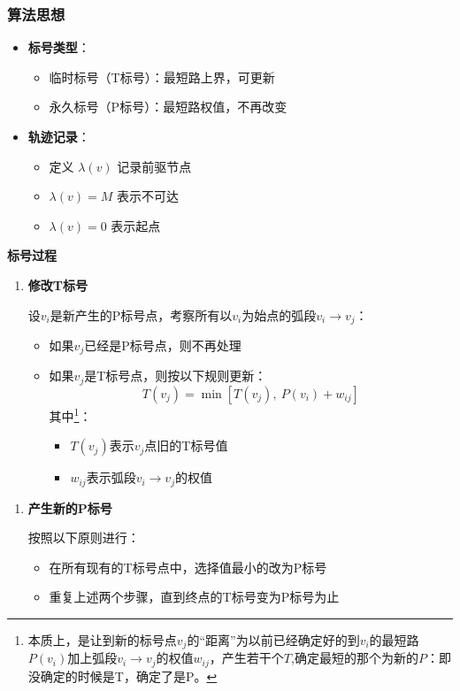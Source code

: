 	\subsubsection{算法思想}
	\begin{itemize}
		\item \textbf{标号类型}：
		\begin{itemize}
			\item 临时标号（T标号）：最短路上界，可更新
			\item 永久标号（P标号）：最短路权值，不再改变
		\end{itemize}
		\item \textbf{轨迹记录}：
		\begin{itemize}
			\item 定义 $\lambda(v)$ 记录前驱节点
			\item $\lambda(v)=M$ 表示不可达
			\item $\lambda(v)=0$ 表示起点
		\end{itemize}
	\end{itemize}
	\begin{notebox}{\textbf{标号过程}}{}
		\begin{enumerate}[label=第一步：, leftmargin=*]
			\item \textbf{修改T标号}
			
			设$v_i$是新产生的P标号点，考察所有以$v_i$为始点的弧段$v_i \to v_j$：
			\begin{itemize}
				\item 如果$v_j$已经是P标号点，则不再处理
				\item 如果$v_j$是T标号点，则按以下规则更新：
				\[ T(v_j) = \min\left[T(v_j),\ P(v_i) + w_{ij}\right] \]
				其中\footnote{本质上，是让到新的标号点$v_{j}$的“距离”为以前已经确定好的到$v_i$的最短路$P(v_i)$加上弧段$v_i \to v_j$的权值$w_{ij}$，产生若干个$T$,确定最短的那个为新的$P$：即没确定的时候是T，确定了是P。}：
				\begin{itemize}
					\item $T(v_j)$表示$v_j$点旧的T标号值
					\item $w_{ij}$表示弧段$v_i \to v_j$的权值
				\end{itemize}
			\end{itemize}
		\end{enumerate}
		
		\begin{enumerate}[label=第二步：, start=2, leftmargin=*]
			\item \textbf{产生新的P标号}
			
			按照以下原则进行：
			\begin{itemize}
				\item 在所有现有的T标号点中，选择值最小的改为P标号
				\item 重复上述两个步骤，直到终点的T标号变为P标号为止
			\end{itemize}
		\end{enumerate}
	\end{notebox}

